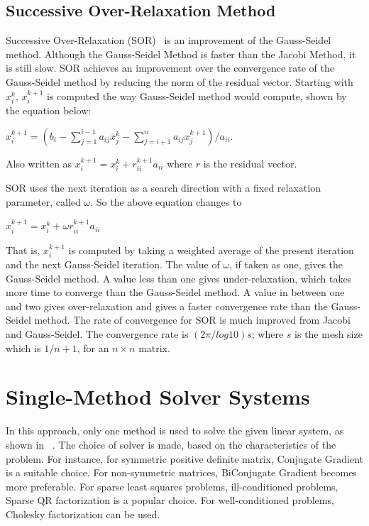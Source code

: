 \subsection{ Successive Over-Relaxation Method}
Successive Over-Relaxation (SOR)~\cite{sor} is an improvement of the Gauss-Seidel method. Although the Gauss-Seidel Method is faster than the Jacobi Method, it is still slow. SOR achieves an improvement over the convergence rate of the Gauss-Seidel method by reducing the norm of the residual vector. 
Starting with $x^{k}_{i}$, $x^{k+1}_{i}$ is computed the way Gauss-Seidel method would compute, shown by the equation below:
\begin{center}
$x^{k+1}_{i} = (b_{i} - \sum_{j = 1}^{i-1} a_{ij}x^{k}_{j} - \sum_{j = i+1}^{n} a_{ij}x^{k+1}_{j}) / a_{ii}$. 
\end{center}

\begin{center}
Also written as $x^{k+1}_{i} = x^{k}_{i} + r^{k+1}_{ii} a_{ii}$ where $r$ is the residual vector.
\end{center}
SOR uses the next iteration as a search direction with a fixed relaxation parameter, called $\omega$. So the above equation changes to 
\begin{center}
$x^{k+1}_{i} = x^{k}_{i} + \omega r^{k+1}_{ii} a_{ii}$ 
\end{center}
That is, $x^{k+1}_{i}$ is computed by taking a weighted average of the present iteration and the next Gauss-Seidel iteration. The value of $\omega$, if taken as one, gives the Gauss-Seidel method. A value less than one gives under-relaxation, which takes more time to converge than the Gauss-Seidel method. A value in between one and two gives over-relaxation and gives a faster convergence rate than the Gauss-Seidel method.
The rate of convergence for SOR is much improved from Jacobi and Gauss-Seidel. The convergence rate is $ (2 \pi /log 10) s  $; where $s$ is the mesh size which is $1/n+1$, for an $n \times n$ matrix.

\section{Single-Method Solver Systems}
In this approach, only one method is used to solve the given linear system, as shown in ~\cite{direct1, lsqr2, lsqr1, cg1, gmres1, bicgstab, chebyshev, fgmres1, fgmres2, bicg1}. The choice of solver is made, based on the characteristics of the problem. For instance, for symmetric positive definite matrix, Conjugate Gradient is a suitable choice. For non-symmetric matrices, BiConjugate Gradient becomes more preferable. For sparse least squares problems, ill-conditioned problems, Sparse QR factorization is a popular choice. For well-conditioned problems, Cholesky factorization can be used. 

